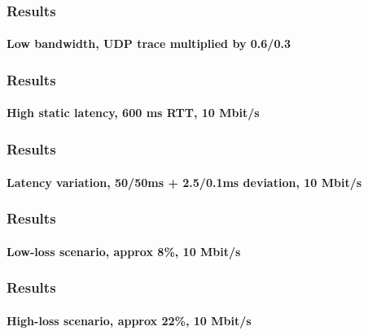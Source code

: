 \begin{frame}

    \frametitle{Results}
    \framesubtitle{Low bandwidth, UDP trace multiplied by 0.6/0.3}

    \begin{overprint}
        \uncover<+->{}
    \end{overprint}

\end{frame}


\begin{frame}

    \frametitle{Results}
    \framesubtitle{High static latency, 600 ms RTT, 10 Mbit/s}

    \begin{overprint}
        \uncover<+->{}
    \end{overprint}

\end{frame}

\begin{frame}

    \frametitle{Results}
    \framesubtitle{Latency variation, 50/50ms + 2.5/0.1ms deviation, 10 Mbit/s}

    \begin{overprint}
        \uncover<+->{}
    \end{overprint}

\end{frame}


\begin{frame}

    \frametitle{Results}
    \framesubtitle{Low-loss scenario, approx 8\%, 10 Mbit/s}

    \begin{overprint}
        \uncover<+->{}
    \end{overprint}

\end{frame}

\begin{frame}

    \frametitle{Results}
    \framesubtitle{High-loss scenario, approx 22\%, 10 Mbit/s}

    \begin{overprint}
        \uncover<+->{}
    \end{overprint}

\end{frame}


